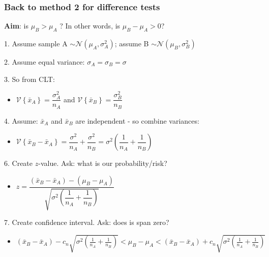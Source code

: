 \begin{frame}\frametitle{Back to method 2 for difference tests}

	\textbf{Aim}: is $\mu_B > \mu_A$ ? In other words, is $\mu_B - \mu_A > 0$?

	1. Assume sample A $\sim \mathcal{N}\left(\mu_A, \sigma^2_A\right)$; assume B $\sim \mathcal{N}\left(\mu_B, \sigma^2_B\right)$

	2. Assume equal variance: $\sigma_A = \sigma_B = \sigma$

	3. So from CLT:
	\begin{itemize}
		\item	$\mathcal{V}\left\{\bar{x}_A\right\} = \dfrac{\sigma^2_A}{n_A}$ and $\mathcal{V}\left\{\bar{x}_B\right\} = \dfrac{\sigma^2_B}{n_B}$
	\end{itemize}

	4. Assume: $\bar{x}_A$ and $\bar{x}_B$ are independent - so combine variances:
	\begin{itemize}
		\item	$\mathcal{V}\left\{\bar{x}_B - \bar{x}_A\right\} = \dfrac{\sigma^2}{n_A} + \dfrac{\sigma^2}{n_B} = \sigma^2 \left(\dfrac{1}{n_A} + \dfrac{1}{n_B}\right)$
	\end{itemize}

	6. Create $z$-value. Ask: what is our probability/risk?
	\begin{itemize}
		\item$z = \dfrac{(\bar{x}_B - \bar{x}_A) - (\mu_B - \mu_A)}{\sqrt{\sigma^2 \left(\dfrac{1}{n_A} + \dfrac{1}{n_B}\right)}}$
	\end{itemize}

	7. Create confidence interval. Ask: does is span zero?
	\begin{itemize}
		\item$(\bar{x}_B - \bar{x}_A) - c_n \sqrt{\sigma^2 (\tfrac{1}{n_A} + \tfrac{1}{n_B})} < \mu_B - \mu_A < (\bar{x}_B - \bar{x}_A) + c_n \sqrt{\sigma^2 (\tfrac{1}{n_A} + \tfrac{1}{n_B})}$
	\end{itemize}
\end{frame}

